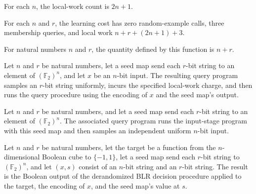 \begin{definition}
\label{FABL.derandomizedBLRLocalWork}
\leanok
For each $n$, the local-work count is $2n+1$.
\end{definition}

\begin{definition}
\label{FABL.derandomizedBLRCost}
\leanok
{}
For each $n$ and $r$, the learning cost has zero random-example calls, three membership
queries, and local work $n+r+(2n+1)+3$.
\end{definition}

\begin{definition}
\label{FABL.derandomizedBLRRandomBits}
\leanok
For natural numbers $n$ and $r$, the quantity defined by this function is $n+r$.
\end{definition}

\begin{definition}
\label{FABL.derandomizedBLRAfterInputProgram}
\leanok
{}
Let $n$ and $r$ be natural numbers, let a seed map send each $r$-bit string to an
element of $(
\mathbb F_2)^n$, and let $x$ be an $n$-bit input. The resulting query program samples an
$r$-bit string uniformly, incurs the specified local-work charge, and then runs the
query procedure using the encoding of $x$ and the seed map’s output.
\end{definition}

\begin{definition}
\label{FABL.derandomizedBLRProgram}
\leanok
{}
Let $n$ and $r$ be natural numbers, and let a seed map send each $r$-bit string to an
element of $(\mathbb F_2)^n$. The associated query program runs the input-stage program
with this seed map and then samples an independent uniform $n$-bit input.
\end{definition}

\begin{definition}
\label{FABL.derandomizedBLRProgramResult}
\leanok
{}
Let $n$ and $r$ be natural numbers, let the target be a function from the
$n$-dimensional Boolean cube to $\{-1,1\}$, let a seed map send each $r$-bit string to
$(\mathbb F_2)^n$, and let $(x,s)$ consist of an $n$-bit string and an $r$-bit string.
The result is the Boolean output of the derandomized BLR decision procedure applied to
the target, the encoding of $x$, and the seed map’s value at $s$.
\end{definition}

